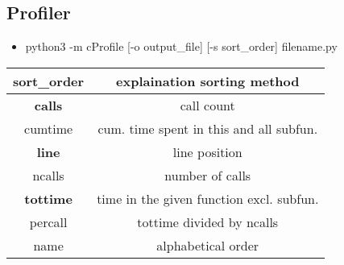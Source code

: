 \documentclass{article}
\begin{document}
\begin{multicols}{2}
\subsection{Profiler}
\begin{itemize}
\item python3 -m cProfile [-o output\_file] [-s sort\_order] filename.py
\end{itemize}
\begin{center}
\begin{tabular}{ |c |c |}
\hline
sort\_order & explaination sorting method \\ \hline \hline
 \textbf{calls} & call count \\ \hline
 cumtime & cum. time spent in this and all subfun. \\  \hline
 \textbf{line} & line position \\ \hline
 ncalls & number of calls \\ \hline
 \textbf{tottime} &  time in the given function excl. subfun.\\  \hline
 percall &  tottime divided by ncalls \\ \hline
 name & alphabetical order \\ \hline   
\end{tabular}
\end{center}




\end{multicols}
\end{document}
